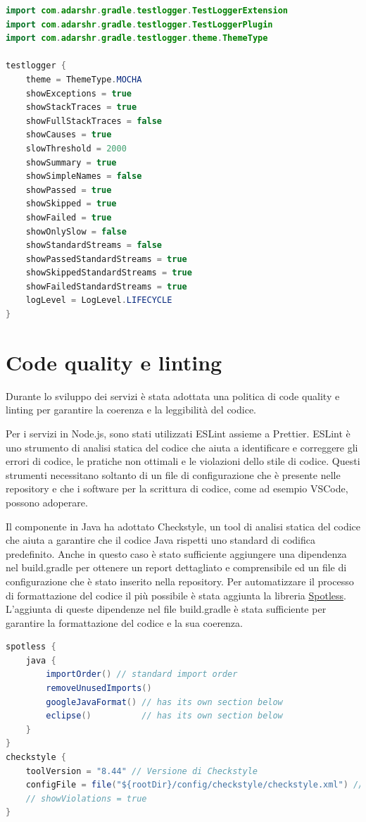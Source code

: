 \begin{lstlisting}[language=Java, caption={Test logger}, label=list:gradle_testlogger]
import com.adarshr.gradle.testlogger.TestLoggerExtension
import com.adarshr.gradle.testlogger.TestLoggerPlugin
import com.adarshr.gradle.testlogger.theme.ThemeType

testlogger {
    theme = ThemeType.MOCHA
    showExceptions = true
    showStackTraces = true
    showFullStackTraces = false
    showCauses = true
    slowThreshold = 2000
    showSummary = true
    showSimpleNames = false
    showPassed = true
    showSkipped = true
    showFailed = true
    showOnlySlow = false
    showStandardStreams = false
    showPassedStandardStreams = true
    showSkippedStandardStreams = true
    showFailedStandardStreams = true
    logLevel = LogLevel.LIFECYCLE
}
\end{lstlisting}

\section{Code quality e linting}

Durante lo sviluppo dei servizi è stata adottata una politica di code quality e linting per garantire la coerenza e la leggibilità del codice.

Per i servizi in Node.js, sono stati utilizzati ESLint assieme a Prettier. ESLint è uno strumento di analisi statica del codice che aiuta a identificare e correggere gli errori di codice, le pratiche non ottimali e le violazioni dello stile di codice.
Questi strumenti necessitano soltanto di un file di configurazione che è presente nelle repository e che i software per la scrittura di codice, come ad esempio VSCode, possono adoperare.

Il componente in Java ha adottato Checkstyle, un tool di analisi statica del codice che aiuta a garantire che il codice Java rispetti uno standard di codifica predefinito. Anche in questo caso è stato sufficiente aggiungere una dipendenza nel build.gradle per ottenere un report dettagliato e comprensibile ed un file di configurazione che è stato inserito nella repository. Per automatizzare il processo di formattazione del codice il più possibile è stata aggiunta la libreria \href{https://github.com/diffplug/spotless}{\underline{Spotless}}. L'aggiunta di queste dipendenze nel file build.gradle è stata sufficiente per garantire la formattazione del codice e la sua coerenza.

\begin{lstlisting}[language=Java, caption={Code quality}, label=list:gradle_codequality]
spotless {
    java {
        importOrder() // standard import order
        removeUnusedImports()
        googleJavaFormat() // has its own section below
        eclipse()          // has its own section below
    }
}
checkstyle {
    toolVersion = "8.44" // Versione di Checkstyle
    configFile = file("${rootDir}/config/checkstyle/checkstyle.xml") // Configurazione di Checkstyle
    // showViolations = true
}
\end{lstlisting}


